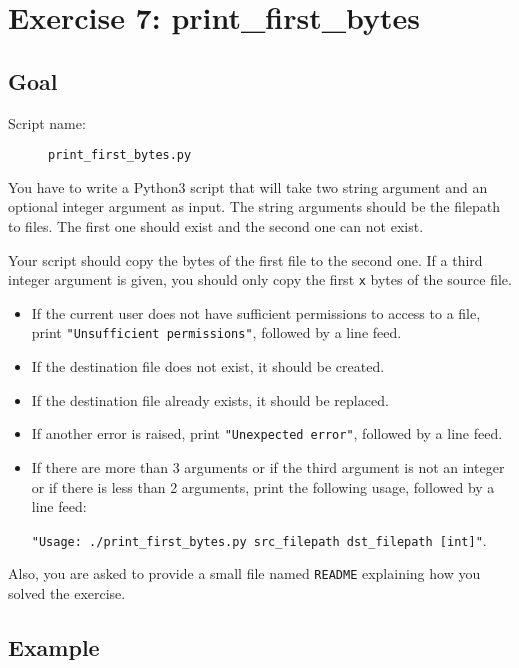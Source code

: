 \documentclass[12pt]{article}
\begin{document}
\section{Exercise 7: print\_first\_bytes}
\subsection{Goal}

\begin{description}
        \item[Script name:] \texttt{print\_first\_bytes.py}
\end{description}

You have to write a Python3 script that will take two string argument and an optional integer argument as input. The string arguments should be  the filepath to files. The first one should exist and the second one can not exist.

Your script should copy the bytes of the first file to the second one. If a third integer argument is given, you should only copy the first \texttt{x} bytes of the source file.

\begin{itemize}
\item If the current user does not have sufficient permissions to access to a file, print \texttt{"Unsufficient permissions"}, followed by a line feed.

\item If the destination file does not exist, it should be created.

\item If the destination file already exists, it should be replaced.

\item If another error is raised, print \texttt{"Unexpected error"}, followed by a line feed.

\item If there are more than 3 arguments or if the third argument is not an integer or if there is less than 2 arguments, print the following usage, followed by a line feed:

\texttt{"Usage: ./print\_first\_bytes.py src\_filepath dst\_filepath [int]"}.
\end{itemize}

Also, you are asked to provide a small file named \texttt{README} explaining how you solved the exercise.

\subsection{Example}
\end{document}
